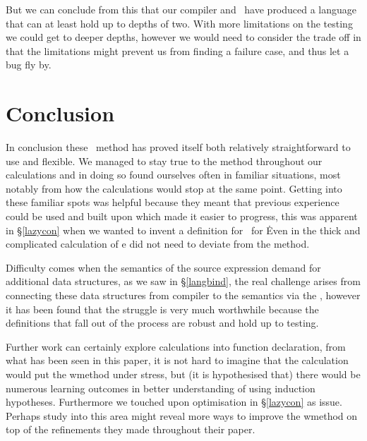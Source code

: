 \documentclass {article}
\begin{document}
But we can conclude from this that our 
compiler and \vm\ have produced a language
that can at least hold up to depths of two.
With more limitations on the testing we
could get to deeper depths, however
we would need to consider the trade off
in that the 
limitations might prevent us from finding 
a failure case, and thus let a bug fly by.

\pagebreak
\section{Conclusion} \label{conclusion}

In conclusion these \BH\ method has proved itself both
relatively straightforward to use and flexible.
We managed to stay true to the method throughout 
our calculations and in doing so found ourselves often in familiar
situations, most notably from how the calculations would
stop at the same point. Getting into these familiar spots
was helpful because they meant that 
previous experience could be used and built upon which made
it easier to progress, this was apparent in \S\ref{lazycon}
when we wanted to invent a definition for \exec\ for \lite\.
Even in the thick and complicated calculation of \let\ we 
did not need to deviate from the method.

Difficulty comes when the semantics of the source
expression demand for additional data structures,
as we saw in \S\ref{langbind}, the real challenge 
arises from connecting these data structures
from compiler to the semantics via the \vm,
however it has been found that the struggle is very much
worthwhile because the definitions that fall out of the
process are robust and hold up to testing.

Further work can certainly explore calculations
into function declaration, 
from what has been seen in this paper,
it is not hard to imagine that the calculation would 
put the \BH\ method under stress, but 
(it is hypothesised that) there would be
numerous learning outcomes in better understanding of 
using induction hypotheses.
Furthermore we touched upon optimisation in
\S\ref{lazycon} as issue. Perhaps study into
this area might reveal more ways to improve the 
\BH\ method on top of the refinements they made
throughout their paper\cite{bandh}.





\end{document}
